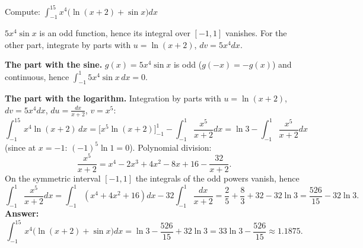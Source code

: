 
\begin{question}
Compute: $\displaystyle\int_{-1}^15x^4\big(\ln(x+2)+\sin x\big)dx$
\end{question}

\begin{hint}
$5x^4\sin x$ is an odd function, hence its integral over $[-1,1]$ vanishes. For the other part, integrate by parts with $u=\ln(x+2)$, $dv=5x^4dx$.
\end{hint}

\begin{solution}
\textbf{The part with the sine.} $g(x)=5x^4\sin x$ is odd ($g(-x)=-g(x)$) and continuous, hence $\int_{-1}^1 5x^4\sin x\,dx=0$.

\textbf{The part with the logarithm.} Integration by parts with $u=\ln(x+2)$, $dv=5x^4dx$, $du=\frac{dx}{x+2}$, $v=x^5$:
\[
\int_{-1}^15x^4\ln(x+2)\,dx=\Big[x^5\ln(x+2)\Big]_{-1}^1-\int_{-1}^1\frac{x^5}{x+2}dx=\ln3-\int_{-1}^1\frac{x^5}{x+2}dx
\]
(since at $x=-1$: $(-1)^5\ln1=0$). Polynomial division:
\[
\frac{x^5}{x+2}=x^4-2x^3+4x^2-8x+16-\frac{32}{x+2}.
\]
On the symmetric interval $[-1,1]$ the integrals of the odd powers vanish, hence
\[
\int_{-1}^1\frac{x^5}{x+2}dx=\int_{-1}^1\left(x^4+4x^2+16\right)dx-32\int_{-1}^1\frac{dx}{x+2}
=\frac25+\frac83+32-32\ln3=\frac{526}{15}-32\ln3.
\]
\textbf{Answer:}
\[
\int_{-1}^15x^4\big(\ln(x+2)+\sin x\big)dx=\ln3-\frac{526}{15}+32\ln3=33\ln3-\frac{526}{15}\approx1.1875.
\]
\end{solution}
